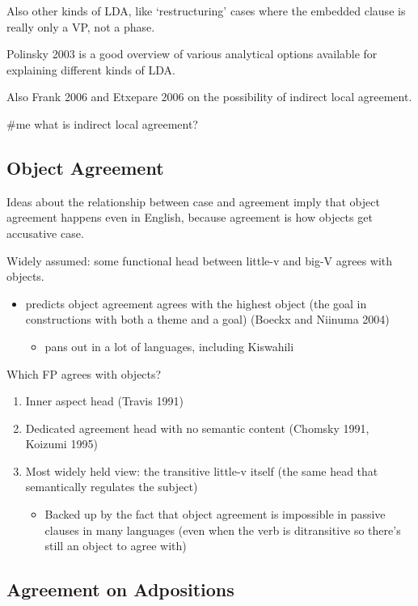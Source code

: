 Also other kinds of LDA, like `restructuring' cases where the embedded clause is really only a VP, not a phase.

Polinsky 2003 is a good overview of various analytical options available for explaining different kinds of LDA.

Also Frank 2006 and Etxepare 2006 on the possibility of indirect local agreement.

\#me what is indirect local agreement?

\subsection*{Object Agreement}

Ideas about the relationship between case and agreement imply that object agreement happens even in English, because agreement is how objects get accusative case.

Widely assumed: some functional head between little-v and big-V agrees with objects.

\begin{itemize}
  \item predicts object agreement agrees with the highest object (the goal in constructions with both a theme and a goal) (Boeckx and Niinuma 2004)
  \begin{itemize}
    \item pans out in a lot of languages, including Kiswahili
  \end{itemize}
\end{itemize}

Which FP agrees with objects?

\begin{enumerate}
  \item Inner aspect head (Travis 1991)
  \item Dedicated agreement head with no semantic content (Chomsky 1991, Koizumi 1995)
  \item Most widely held view: the transitive little-v itself (the same head that semantically regulates the subject)
  \begin{itemize}
    \item Backed up by the fact that object agreement is impossible in passive clauses in many languages (even when the verb is ditransitive so there's still an object to agree with)
  \end{itemize}
\end{enumerate}

\subsection*{Agreement on Adpositions}

